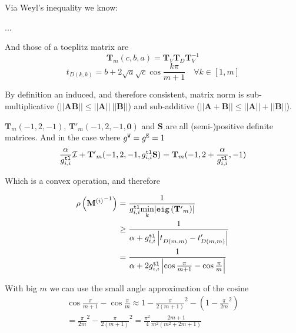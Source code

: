 \documentclass[journal,onecolumn]{IEEEtran}
\newcommand{\vtt}[1]{%
  \text{\normalfont\ttfamily\detokenize{#1}}%
}
\begin{document}
    Via Weyl's inequality we know:
    
    ...%
\fi

And those of a toeplitz matrix are
$$\mathbf{T}_m (c,b,a) = \mathbf{T}_V \mathbf{T}_D \mathbf{T}_V^{-1}$$
$$t_{D(k,k)} = b + 2\sqrt{a}\sqrt{c}\cos{\frac{k\pi}{m + 1}} \quad \forall k \in [1, m]$$

By definition an induced, and therefore consistent, matrix norm is sub-multiplicative ($||\mathbf{A}\mathbf{B}|| \le ||\mathbf{A}|| ~ ||\mathbf{B}||$) and sub-additive ($||\mathbf{A} + \mathbf{B}|| \le ||\mathbf{A}|| + ||\mathbf{B}||$).  %

$\mathbf{T}_m (-1,2,-1)$, $\mathbf{T'}_m (-1,2,-1,\mathbf{0})$ and $\mathbf{S}$ are all (semi-)positive definite matrices. And in the case where $g^\vtt{W} = g^\vtt{E} = 1$
$$\frac{\alpha}{g^\vtt{tl}_{i,i}} \mathcal{I} + \mathbf{T'}_m (-1,2,-1,g^\vtt{tl}_{i,i}\mathbf{S}) = \mathbf{T}_m (-1,2 + \frac{\alpha}{g^\vtt{tl}_{i,i}},-1)$$

Which is a convex operation, and therefore

\begin{align*}
\rho \left( {\mathbf{M}^{(i)}}^{-1} \right) & = \frac{1}{g^\vtt{tl}_{i,i} \underset{k}{\min} {\left| \vtt{eig}\left( \mathbf{T'}_m \right)\right|}} \\ & \ge
\frac{1}{\alpha + g^\vtt{tl}_{i,i} \left| t^{}_{D(m,m)} - t'_{D(m,m)} \right|} \\ & = 
\frac{1}{\alpha + 2g^\vtt{tl}_{i,i} \left| \cos{\frac{\pi}{m + 1}} - \cos{\frac{\pi}{m}} \right|}  %
\end{align*}

With big $m$ we can use the small angle approximation of the cosine
\begin{gather*}
\cos{\frac{\pi}{m + 1}} - \cos{\frac{\pi}{m}} \approx 1 - \frac{\pi}{2(m + 1)}^2 - \left( 1 - \frac{\pi}{2m}^2 \right) \\ = 
\frac{\pi}{2m}^2 - \frac{\pi}{2(m + 1)}^2 = \frac{\pi^2}{4}\frac{2m + 1}{m^2(m^2 + 2m + 1)}
\end{gather*}

\iffalse
\end{document}
